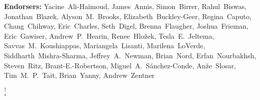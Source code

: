 \begin{raggedright}
\textbf{Endorsers:}
Yacine~Ali-Ha\"imoud,
James~Annis,
Simon~Birrer,
Rahul~Biswas,
Jonathan~Blazek,
Alyson~M.~Brooks,
Elizabeth~Buckley-Geer,
Regina~Caputo,
Chang~Chihway,
Eric~Charles,
Seth~Digel,
Brenna~Flaugher,
Joshua~Frieman,
Eric~Gawiser,
Andrew~P.~Hearin,
Renee~Hlo\v{z}ek,
Tesla~E.~Jeltema,
Savvas~M.~Koushiappas,
Mariangela~Lisanti,
Marilena~LoVerde,
Siddharth~Mishra-Sharma,
Jeffrey~A.~Newman,
Brian~Nord,
Erfan~Nourbakhsh,
Steven~Ritz,
Brant-E.-Robertson,
Miguel~A.~S\'anchez-Conde,
An\v{z}e~Slosar,
Tim~M.~P.~Tait,
Brian~Yanny,
Andrew~Zentner


$^\dagger$  \\
$^*$ 

\begin{multicols}{2}
\scriptsize
\parskip=4pt



\end{multicols}
\end{raggedright}

